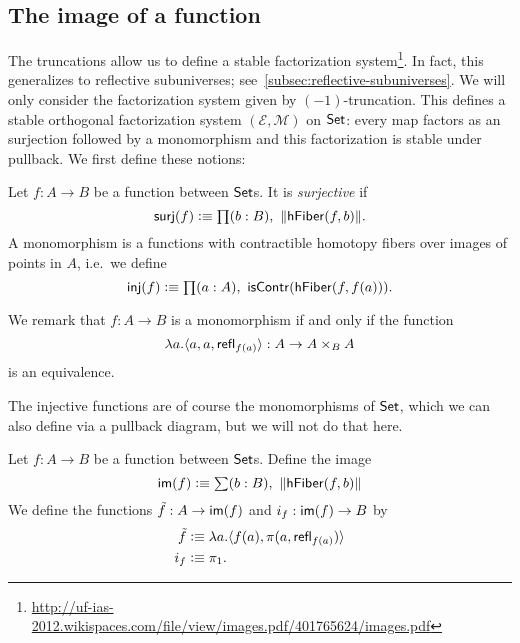 \subsection{The image of a function}
The truncations allow us to define a stable factorization
system\footnote{\url{http://uf-ias-2012.wikispaces.com/file/view/images.pdf/401765624/images.pdf}}.
In fact, this generalizes to reflective subuniverses; see~\autoref{subsec:reflective-subuniverses}.
We will only consider the factorization system given by $(-1)$-truncation.
This defines a stable orthogonal factorization system $(\mathcal{E},
\mathcal{M})$ on $\mathsf{Set}$: every map factors as an surjection followed by a 
monomorphism and this factorization is stable under pullback.
We first define these notions:
\begin{defn}
Let $f:A\to B$ be a function between $\mathsf{Set}$s. It is \emph{surjective} if
\begin{equation*}
\mathsf{surj}(f)\defeq\prd{b:B} \|\hfiber{f}b\|.
\end{equation*}
A monomorphism is a functions with contractible homotopy fibers over images of points in $A$, i.e.\ we define
\begin{equation*}
\mathsf{inj}(f)\defeq\prd{a:A} \mathsf{isContr}(\hfiber{f}{f(a)}).
\end{equation*}
\end{defn}

We remark that $f:A\to B$ is a monomorphism if and only if the function
\begin{equation*}
\lambda a.{\langle a,a,\mathsf{refl}_{f(a)}\rangle}:A\to A\times_B A
\end{equation*}
is an equivalence.

The injective functions are of course the monomorphisms of
$\mathsf{Set}$, which we can also define via a pullback diagram, but we will not do that here.

\begin{defn}
Let $f:A\to B$ be a function between $\mathsf{Set}$s. Define the image 
\begin{equation*}
\im(f)\defeq\sm{b:B} \|\hfiber{f}b\|
\end{equation*}
We define the functions $\tilde{f}:A\to\mathsf{im}(f)$ and $i_f:\mathsf{im}(f)\to B$ by
\begin{align*}
\tilde{f} & \vcentcolon\equiv \lambda a.{\langle f(a),\pi(a,\mathsf{refl}_{f(a)})\rangle}\\
i_f & \vcentcolon\equiv \pi_1.
\end{align*}
\end{defn}

